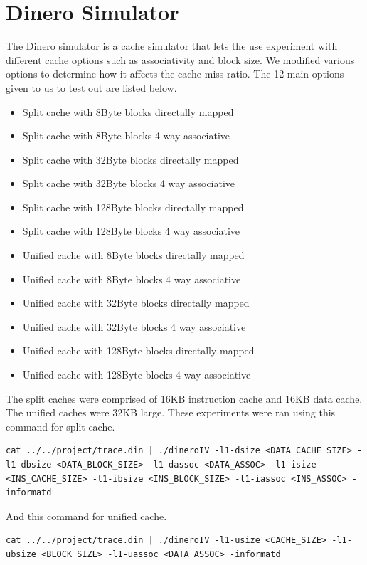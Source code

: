 \documentclass{article}
\begin{document}
	\section{Dinero Simulator}
		The Dinero simulator is a cache simulator that lets the use experiment with different cache options such as associativity and block size. We modified various options to determine how it affects the cache miss ratio. The 12 main options given to us to test out are listed below.
		\begin{itemize}
			\item Split cache with 8Byte blocks directally mapped
			\item Split cache with 8Byte blocks 4 way associative
			\item Split cache with 32Byte blocks directally mapped
			\item Split cache with 32Byte blocks 4 way associative
			\item Split cache with 128Byte blocks directally mapped
			\item Split cache with 128Byte blocks 4 way associative
			\item Unified cache with 8Byte blocks directally mapped
			\item Unified cache with 8Byte blocks 4 way associative
			\item Unified cache with 32Byte blocks directally mapped
			\item Unified cache with 32Byte blocks 4 way associative
			\item Unified cache with 128Byte blocks directally mapped
			\item Unified cache with 128Byte blocks 4 way associative
		\end{itemize}
		The split caches were comprised of 16KB instruction cache and 16KB data cache. The unified caches were 32KB large. These experiments were ran using this command for split cache.
		\begin{lstlisting}
cat ../../project/trace.din | ./dineroIV -l1-dsize <DATA_CACHE_SIZE> -l1-dbsize <DATA_BLOCK_SIZE> -l1-dassoc <DATA_ASSOC> -l1-isize <INS_CACHE_SIZE> -l1-ibsize <INS_BLOCK_SIZE> -l1-iassoc <INS_ASSOC> -informatd
		\end{lstlisting}
		And this command for unified cache.
		\begin{lstlisting}
cat ../../project/trace.din | ./dineroIV -l1-usize <CACHE_SIZE> -l1-ubsize <BLOCK_SIZE> -l1-uassoc <DATA_ASSOC> -informatd
		\end{lstlisting}
		\par
\end{document}

